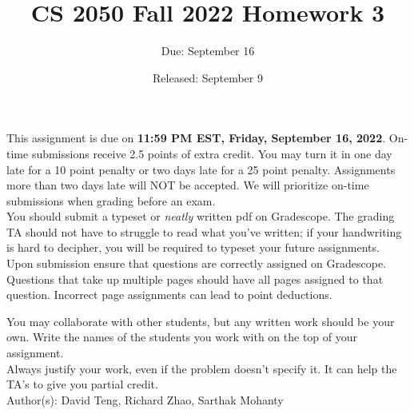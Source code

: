 \documentclass{article}
\title{CS 2050 Fall 2022 Homework 3}
\author{Due: September 16}
\date{Released: September 9}
\begin{document}
\maketitle

This assignment is due on \textbf{11:59 PM EST, Friday, September 16, 2022}.  On-time submissions receive 2.5 points of extra credit. You may turn it in one day late for a 10 point penalty or two days late for a 25 point penalty. Assignments more than two days late will NOT be accepted.  We will prioritize on-time submissions when grading before an exam. \\ 

You should submit a typeset or \emph{neatly} written pdf on Gradescope.  The grading TA should not have to struggle to read what you've written; if your handwriting is hard to decipher, you will be required to typeset your future assignments.\\ 

Upon submission ensure that questions are correctly assigned on Gradescope. Questions that take up multiple pages should have all pages assigned to that question. Incorrect page assignments can lead to point deductions.

You may collaborate with other students, but any written work should be your own. Write the names of the students you work with on the top of your assignment.\\

Always justify your work, even if the problem doesn't specify it. It can help the TA's to give you partial credit.
\\

Author(s): David Teng, Richard Zhao, Sarthak Mohanty

\clearpage
\end{document}
